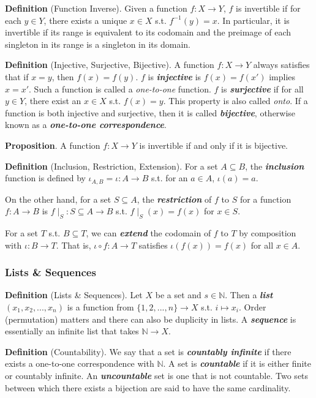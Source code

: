 \textbf{Definition} (Function Inverse). Given a function $f:X\to Y$, $f$ is invertible if for each $y\in Y$, there exists a unique $x\in X$ s.t. $f^{-1}(y)=x$. In particular, it is invertible if its range is equivalent to its codomain and the preimage of each singleton in its range is a singleton in its domain.

\textbf{Definition} (Injective, Surjective, Bijective). A function $f:X\to Y$ always satisfies that if $x=y$, then $f(x)=f(y)$. $f$ is \textbf{\textit{injective}} is $f(x)=f(x')$ implies $x=x'$. Such a function is called a \textit{one-to-one} function. $f$ is \textbf{\textit{surjective}} if for all $y\in Y$, there exist an $x\in X$ s.t. $f(x)=y$. This property is also called \textit{onto}. If a function is both injective and surjective, then it is called \textbf{\textit{bijective}}, otherwise known as a \textbf{\textit{one-to-one correspondence}}.

\textbf{Proposition}. A function $f:X\to Y$ is invertible if and only if it is bijective.

\textbf{Definition} (Inclusion, Restriction, Extension). For a set $A\subseteq B$, the \textbf{\textit{inclusion}} function is defined by $\iota_{A,B}=\iota:A\to B$ s.t. for an $a\in A$, $\iota(a)=a$. 

On the other hand, for a set $S\subseteq A$, the \textbf{\textit{restriction}} of $f$ to $S$ for a function $f:A\to B$ is $f\mid_S:S\subseteq A\to B$ s.t. $f\mid_S(x)=f(x)$ for $x\in S$. 

For a set $T$ s.t. $B\subseteq T$, we can \textbf{\textit{extend}} the codomain of $f$ to $T$ by composition with $\iota:B\to T$. That is, $\iota\circ f:A\to T$ satisfies $\iota(f(x))=f(x)$ for all $x\in A$.

\subsubsection{Lists \& Sequences}
\textbf{Definition} (Lists \& Sequences). Let $X$ be a set and $s\in\mathbb{N}$. Then a \textbf{\textit{list}} $(x_1, x_2,..., x_n)$ is a function from $\{1,2,...,n\}\to X$ s.t. $i\mapsto x_i$. Order (permutation) matters and there can also be duplicity in lists. A \textbf{\textit{sequence}} is essentially an infinite list that takes $\mathbb{N}\to X$.

\textbf{Definition} (Countability). We say that a set is \textbf{\textit{countably infinite}} if there exists a one-to-one correspondence with $\mathbb{N}$. A set is \textbf{\textit{countable}} if it is either finite or countably infinite. An \textbf{\textit{uncountable}} set is one that is not countable. Two sets between which there exists a bijection are said to have the same cardinality.

